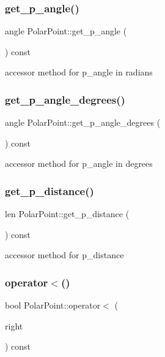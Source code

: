 \subsubsection{\texorpdfstring{get\+\_\+p\+\_\+angle()}{get\_p\_angle()}}
{\footnotesize\ttfamily angle Polar\+Point\+::get\+\_\+p\+\_\+angle (\begin{DoxyParamCaption}{ }\end{DoxyParamCaption}) const}

accessor method for p\+\_\+angle in radians \mbox{\label{classPolarPoint_a32537087535c21aee75a7799c168645d}} 
\subsubsection{\texorpdfstring{get\+\_\+p\+\_\+angle\+\_\+degrees()}{get\_p\_angle\_degrees()}}
{\footnotesize\ttfamily angle Polar\+Point\+::get\+\_\+p\+\_\+angle\+\_\+degrees (\begin{DoxyParamCaption}{ }\end{DoxyParamCaption}) const}

accessor method for p\+\_\+angle in degrees \mbox{\label{classPolarPoint_afb68d253c45fe88bc49fafcf81ec2276}} 
\subsubsection{\texorpdfstring{get\+\_\+p\+\_\+distance()}{get\_p\_distance()}}
{\footnotesize\ttfamily len Polar\+Point\+::get\+\_\+p\+\_\+distance (\begin{DoxyParamCaption}{ }\end{DoxyParamCaption}) const}

accessor method for p\+\_\+distance \mbox{\label{classPolarPoint_a705e9afe8f23c0cac34b25a006c574e8}} 
\subsubsection{\texorpdfstring{operator$<$()}{operator<()}}
{\footnotesize\ttfamily bool Polar\+Point\+::operator$<$ (\begin{DoxyParamCaption}\item[{const \hyperlink{classPolarPoint}{Polar\+Point} \&}]{right }\end{DoxyParamCaption}) const}

